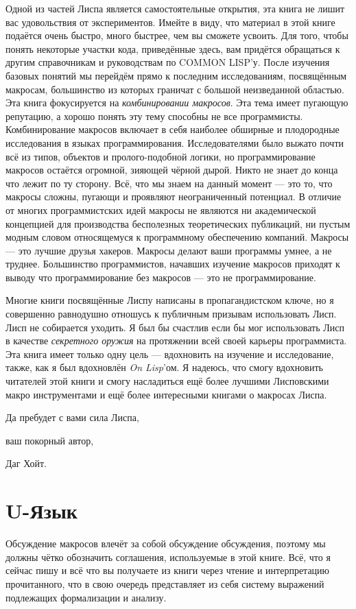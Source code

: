 Одной из частей Лиспа является самостоятельные открытия, эта кни\-га не лишит вас удовольствия от экспериментов. Имейте в виду, что материал в этой книге подаётся очень быстро, много быстрее, чем вы сможете усвоить. Для того, чтобы понять некоторые участки кода, приведённые здесь, вам придётся обращаться к другим справочникам и руководствам по COMMON LISP'у. После изучения базовых понятий мы перейдём прямо к последним исследованиям, посвящённым макросам, большинство из которых граничат с большой неизведанной областью. Эта книга фокусируется на \emph{комбинировании макросов}. Эта тема имеет пугающую репутацию, а хорошо понять эту тему способны не все прог\-рам\-мисты. Комбинирование макросов включает в себя наиболее об\-шир\-ные и плодородные исследования в языках программирования. Ис\-сле\-до\-ва\-те\-лями было выжато почти всё из типов, объектов и пролого-подобной логики, но программирование макросов остаётся огромной, зияющей чёрной дырой. Никто не знает до конца что лежит по ту сторону. Всё, что мы знаем на данный момент --- это то, что макросы сложны, пугающи и проявляют неограниченный потенциал. В отличие от многих программистских идей макросы не являются ни ака\-де\-ми\-ческой концепцией для производства бесполезных теоретических пуб\-ли\-каций, ни пустым модным словом относящемуся к программному обес\-пе\-че\-нию компаний. Макросы --- это лучшие друзья хакеров. Макросы делают ваши программы умнее, а не труднее. Большинство прог\-рам\-мис\-тов, начавших изучение макросов приходят к выводу что прог\-рам\-ми\-ро\-ва\-ние без макросов --- это не программирование.

Многие книги посвящённые Лиспу написаны в про\-па\-ган\-дист\-ском \-клю\-че, но я совершенно равнодушно отношусь к публичным призывам использовать Лисп. Лисп не собирается уходить. Я был бы счастлив если бы мог использовать Лисп в качестве \emph{секретного оружия} на про\-тя\-же\-нии всей своей карьеры программиста. Эта книга имеет только одну цель --- вдохновить на изучение и исследование, также, как я был вдохновлён \emph{On Lisp}'ом. Я надеюсь, что смогу вдохновить читателей этой книги и смогу насладиться ещё более лучшими Лисповскими макро инструментами и ещё более интересными книгами о макросах Лиспа.

Да пребудет с вами сила Лиспа,

ваш покорный автор,

Даг Хойт.
\section{U-Язык}\label{section_u_language}
Обсуждение макросов влечёт за собой обсуждение обсуждения, поэтому мы должны чётко обозначить соглашения, используемые в этой книге. Всё, что я сейчас пишу и всё что вы получаете из книги через чтение и интерпретацию прочитанного, что в свою очередь представляет из себя систему выражений подлежащих формализации и анализу.

